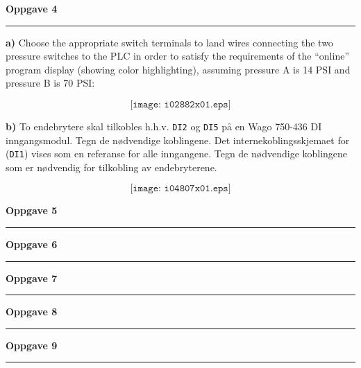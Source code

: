 

\vfil \eject
\textbf{Oppgave 4}
\vskip 5pt
\hrule
\vskip 5pt
\textbf{a)} Choose the appropriate switch terminals to land wires connecting the two pressure switches to the PLC in order to satisfy the requirements of the ``online'' program display (showing color highlighting), assuming pressure A is 14 PSI and pressure B is 70 PSI:

$$\texttt{[image: i02882x01.eps]}$$

\vskip 1cm
\textbf{b) }To endebrytere skal tilkobles h.h.v. \texttt{DI2} og \texttt{DI5} på en Wago 750-436 DI inngangsmodul. Tegn de nødvendige koblingene. Det internekoblingsskjemaet for (\texttt{DI1}) vises som en referanse for alle inngangene.
Tegn de nødvendige koblingene som er nødvendig for tilkobling av endebryterene.  


$$\texttt{[image: i04807x01.eps]}$$

\vfil \eject
\textbf{Oppgave 5}
\vskip 5pt
\hrule

\vskip 5pt


\vfil \eject
\textbf{Oppgave 6}
\vskip 5pt
\hrule

\vskip 5pt


\vfil
\vfil \eject
\textbf{Oppgave 7}
\vskip 5pt
\hrule

\vskip 5pt

\vfil \eject
\textbf{Oppgave 8}
\vskip 5pt
\hrule

\vskip 5pt


\filbreak
\vfil \eject
\textbf{Oppgave 9}
\vskip 5pt
\hrule

\vskip 5pt





